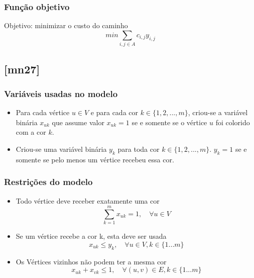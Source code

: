 \documentclass[11pt,letterpaper]{article}
\begin{document}
\subsubsection*{Função objetivo}
Objetivo: minimizar o custo do caminho 
\begin{equation}
min\sum_{{i,j} \in A}c_{i,j}y_{i,j}
\end{equation}

\subsection{{[}mn27{]}}

\subsubsection*{Variáveis usadas no modelo}
\begin{itemize}
\item Para cada vértice $u \in V$ e para cada cor $k \in \{1,2,...,m\}$, criou-se
a variável binária $x_{uk}$ que assume valor $x_{uk}=1$ se e somente se o vértice $u$ foi
colorido com a cor $k$.

\item Criou-se uma variável binária $y_k$ para toda cor $k \in
  \{1,2,...,m\}$. $y_k=1$ se e somente se pelo menos um vértice recebeu essa cor.
\end{itemize}

\subsubsection*{Restrições do modelo}
\begin{itemize}

\item Todo vértice deve receber exatamente uma cor
\begin{equation*}
  \sum_{k=1}^{m}x_{uk}=1,\quad \forall u \in V
\end{equation*}

\item Se um vértice recebe a cor k, esta deve ser usada
\begin{equation*}
  x_{uk} \leq y_k, \quad\forall u \in V, k \in \{1 ... m\}
\end{equation*}

\item Os Vértices vizinhos não podem ter a mesma cor
\begin{equation*}
  x_{uk} + x_{vk} \leq 1, \quad\forall (u,v) \in E, k \in \{1 ... m\}
\end{equation*}
 
\end{itemize}
\end{document}
